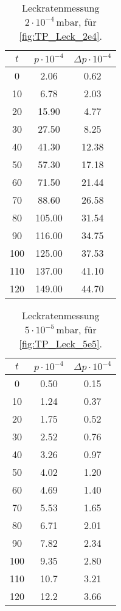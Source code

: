 \begin{table}[H]
    \centering
    \caption{Leckratenmessung $2 \cdot 10^{-4} \, \si{\milli\bar}$, für  \autoref{fig:TP_Leck_2e4}.}
    \label{tab:TP_Leck_2e4}
    \begin{tabular}{c c c}
        \toprule
        {$t$} & {$p \cdot 10^{-4}$} & {$\Delta p \cdot 10^{-4}$} \\
        \midrule
        0 &   2.06 & 0.62\\
        10 &  6.78 & 2.03\\
        20 &  15.90 & 4.77\\
        30 &  27.50 & 8.25\\
        40 &  41.30 & 12.38\\
        50 &  57.30 & 17.18\\
        60 &  71.50 & 21.44\\
        70 &  88.60 & 26.58\\
        80 &  105.00 & 31.54\\
        90 &  116.00 & 34.75\\
        100 & 125.00 & 37.53\\
        110 & 137.00 & 41.10\\
        120 & 149.00 & 44.70\\
        \bottomrule
    \end{tabular}
\end{table}

\begin{table}[H]
    \centering
    \caption{Leckratenmessung $5 \cdot 10^{-5} \, \si{\milli\bar}$, für  \autoref{fig:TP_Leck_5e5}.}
    \label{tab:TP_Leck_5e5}
    \begin{tabular}{c c c}
        \toprule
        {$t$} & {$p \cdot 10^{-4}$} & {$\Delta p \cdot 10^{-4}$} \\
        \midrule
        0 &   0.50 & 0.15\\
        10 &  1.24 & 0.37\\
        20 &  1.75 & 0.52\\
        30 &  2.52 & 0.76\\
        40 &  3.26 & 0.97\\
        50 &  4.02 & 1.20\\
        60 &  4.69 & 1.40\\
        70 &  5.53 & 1.65\\
        80 &  6.71 & 2.01\\
        90 &  7.82 & 2.34\\
        100 & 9.35 & 2.80\\
        110 & 10.7 & 3.21\\
        120 & 12.2 & 3.66\\
        \bottomrule
    \end{tabular}
\end{table}

